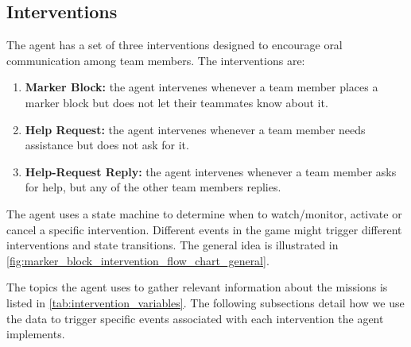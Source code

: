 \subsection{Interventions}
\label{subsec:interventions}

The agent has a set of three interventions designed to encourage oral
communication among team members. The interventions are:

\begin{enumerate}

    \item \textbf{Marker Block:} the agent intervenes whenever a team member
        places a marker block but does not let their teammates know about it.

    \item \textbf{Help Request:} the agent intervenes whenever a team member
        needs assistance but does not ask for it.

    \item \textbf{Help-Request Reply:} the agent intervenes whenever a team
        member asks for help, but any of the other team members replies.

\end{enumerate}

The agent uses a state machine to determine when to watch/monitor, activate or
cancel a specific intervention. Different events in the game might trigger
different interventions and state transitions. The general idea is illustrated
in \autoref{fig:marker_block_intervention_flow_chart_general}.  

The topics the agent uses to gather relevant information about the missions is listed in \autoref{tab:intervention_variables}.
The following subsections detail how we use the data to trigger specific events associated with each intervention the agent implements.

